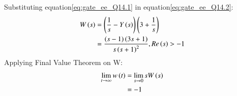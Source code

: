 \documentclass[journal,12pt,twocolumn]{IEEEtran}
\theoremstyle{remark}
\begin{document}
Substituting equation\eqref{eq:gate_ee_Q14.1} in  equation\eqref{eq:gate_ee_Q14.2}:
\begin{align}
    W\left(s\right) &= \left(\frac{1}{s} - Y\left(s\right)\right)\left(3 + \frac{1}{s}\right)\\
            &= \frac{\left(s-1\right)\left(3s+1\right)}{s\left(s+1\right)^2} ,  Re\left(s\right)>-1
\end{align}
Applying Final Value Theorem on W:
\begin{align}
     \lim_{t \to \infty} w\left(t\right)&= \lim_{s \to 0} sW\left(s\right)\\
                            &= -1
\end{align}
\end{document}
